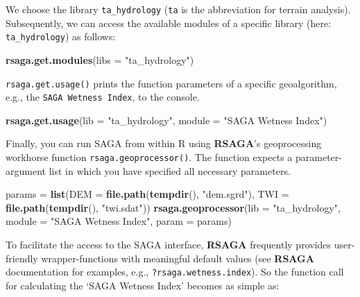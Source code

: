 \documentclass[]{krantz}
\newenvironment{Shaded}{\begin{snugshade}}{\end{snugshade}}
\newcommand{\DataTypeTok}[1]{\textcolor[rgb]{0.27,0.27,0.27}{#1}}
\newcommand{\KeywordTok}[1]{\textcolor[rgb]{0.27,0.27,0.27}{\textbf{#1}}}
\newcommand{\NormalTok}[1]{#1}
\newcommand{\StringTok}[1]{\textcolor[rgb]{0.5,0.5,0.5}{#1}}
\begin{document}
We choose the library \texttt{ta\_hydrology} (\texttt{ta} is the abbreviation for terrain analysis).
Subsequently, we can access the available modules of a specific library (here: \texttt{ta\_hydrology}) as follows:

\begin{Shaded}
\begin{Highlighting}[]
\KeywordTok{rsaga.get.modules}\NormalTok{(}\DataTypeTok{libs =} \StringTok{"ta_hydrology"}\NormalTok{)}
\end{Highlighting}
\end{Shaded}

\texttt{rsaga.get.usage()} prints the function parameters of a specific geoalgorithm, e.g., the \texttt{SAGA\ Wetness\ Index}, to the console.

\begin{Shaded}
\begin{Highlighting}[]
\KeywordTok{rsaga.get.usage}\NormalTok{(}\DataTypeTok{lib =} \StringTok{"ta_hydrology"}\NormalTok{, }\DataTypeTok{module =} \StringTok{"SAGA Wetness Index"}\NormalTok{)}
\end{Highlighting}
\end{Shaded}

Finally, you can run SAGA from within R using \textbf{RSAGA}'s geoprocessing workhorse function \texttt{rsaga.geoprocessor()}.
The function expects a parameter-argument list in which you have specified all necessary parameters.

\begin{Shaded}
\begin{Highlighting}[]
\NormalTok{params =}\StringTok{ }\KeywordTok{list}\NormalTok{(}\DataTypeTok{DEM =} \KeywordTok{file.path}\NormalTok{(}\KeywordTok{tempdir}\NormalTok{(), }\StringTok{"dem.sgrd"}\NormalTok{),}
              \DataTypeTok{TWI =} \KeywordTok{file.path}\NormalTok{(}\KeywordTok{tempdir}\NormalTok{(), }\StringTok{"twi.sdat"}\NormalTok{))}
\KeywordTok{rsaga.geoprocessor}\NormalTok{(}\DataTypeTok{lib =} \StringTok{"ta_hydrology"}\NormalTok{, }\DataTypeTok{module =} \StringTok{"SAGA Wetness Index"}\NormalTok{, }
                   \DataTypeTok{param =}\NormalTok{ params)}
\end{Highlighting}
\end{Shaded}

To facilitate the access to the SAGA interface, \textbf{RSAGA} frequently provides user-friendly wrapper-functions with meaningful default values (see \textbf{RSAGA} documentation for examples, e.g., \texttt{?rsaga.wetness.index}).
So the function call for calculating the `SAGA Wetness Index' becomes as simple as:
\end{document}

